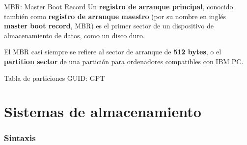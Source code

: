 \begin{frame}[c]{MBR: Master Boot Record}
  Un \textbf{registro de arranque principal}, conocido también como
  \textbf{registro de arranque maestro} (por su nombre en inglés
  \textbf{master boot record}, MBR) es el
  primer sector de un dispositivo de almacenamiento de datos, como un disco
  duro.

  \vspace{\baselineskip}
  El MBR casi siempre se refiere al sector de arranque de \textbf{512 bytes},
  o el \textbf{partition sector} de una partición para ordenadores
  compatibles con IBM PC.

  \vspace{\baselineskip}
  \begin{center}
  \end{center}
\end{frame}

\begin{frame}[c]{Tabla de particiones GUID: GPT}

\end{frame}

\section{Sistemas de almacenamiento}

\begin{frame}[fragile]
  \frametitle{Sintaxis}

  \vspace{\baselineskip}
\end{frame}
